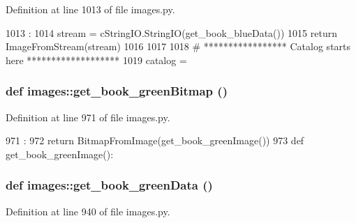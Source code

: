 Definition at line 1013 of file images.py.


\begin{DoxyCode}
1013                         :
1014     stream = cStringIO.StringIO(get_book_blueData())
1015     return ImageFromStream(stream)
1016 
1017 
1018 # ***************** Catalog starts here *******************
1019 
catalog = {}
\end{DoxyCode}
\hypertarget{namespaceimages_a0d6123d722de67b8e190f263755b3aa9}{
\subsubsection[{get\_\-book\_\-greenBitmap}]{\setlength{\rightskip}{0pt plus 5cm}def images::get\_\-book\_\-greenBitmap ()}}
\label{namespaceimages_a0d6123d722de67b8e190f263755b3aa9}


Definition at line 971 of file images.py.


\begin{DoxyCode}
971                           :
972     return BitmapFromImage(get_book_greenImage())
973 
def get_book_greenImage():
\end{DoxyCode}
\hypertarget{namespaceimages_af0431269fe4a06cfc32baca55c2f4878}{
\subsubsection[{get\_\-book\_\-greenData}]{\setlength{\rightskip}{0pt plus 5cm}def images::get\_\-book\_\-greenData ()}}
\label{namespaceimages_af0431269fe4a06cfc32baca55c2f4878}


Definition at line 940 of file images.py.


